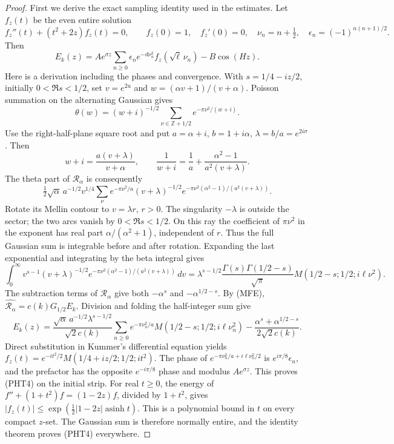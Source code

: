 \documentclass[11pt]{article}
\theoremstyle{remark}\newtheorem{remark}[theorem]{Remark}
\begin{document}
\begin{proof}
First we derive the exact sampling identity used in the estimates.
Let $f_z(t)$ be the even entire solution
\[
 f_z''(t)+(t^2+2z)f_z(t)=0,\qquad f_z(0)=1,\quad f_z'(0)=0,
 \quad \nu_n=n+\tfrac12,\quad \epsilon_n=(-1)^{n(n+1)/2}.
\]
Then
\[
 E_k(z)=Ae^{\sigma z}\sum_{n\ge0}\epsilon_ne^{-d\nu_n^2}
                   f_z(\sqrt\ell\,\nu_n)-B\cos(Hz).        \tag{PHT4}
\]
Here is a derivation including the phases and convergence.
With $s=1/4-iz/2$, initially $0<\Re s<1/2$, set
$v=e^{2u}$ and $w=(\alpha v+1)/(v+\alpha)$.
Poisson summation on the alternating Gaussian gives
\[
 \theta(w)=(w+i)^{-1/2}
       \sum_{\nu\in\mathbb Z+1/2}e^{-\pi\nu^2/(w+i)}.
\]
Use the right-half-plane square root and put
$a=\alpha+i$, $b=1+i\alpha$, $\lambda=b/a=e^{2i\sigma}$.
Then
\[
 w+i=\frac{a(v+\lambda)}{v+\alpha},\qquad
 \frac1{w+i}=\frac1a+\frac{\alpha^2-1}{a^2(v+\lambda)}.
\]
The theta part of $\mathcal R_\alpha$ is consequently
\[
 \tfrac12\sqrt\alpha\,a^{-1/2}v^{1/4}
 \sum_\nu e^{-\pi\nu^2/a}(v+\lambda)^{-1/2}
       e^{-\pi\nu^2(\alpha^2-1)/(a^2(v+\lambda))}.
\]
Rotate its Mellin contour to $v=\lambda r$, $r>0$.
The singularity $-\lambda$ is outside the sector; the two arcs
vanish by $0<\Re s<1/2$. On this ray the coefficient of $\pi\nu^2$
in the exponent has real part $\alpha/(\alpha^2+1)$,
independent of $r$. Thus the full Gaussian sum is integrable
before and after rotation. Expanding the last exponential and
integrating by the beta integral gives
\[
 \int_0^\infty v^{s-1}(v+\lambda)^{-1/2}
 e^{-\pi\nu^2(\alpha^2-1)/(a^2(v+\lambda))}\,dv
 =\lambda^{s-1/2}\frac{\Gamma(s)\Gamma(1/2-s)}{\sqrt\pi}
                  M(1/2-s;1/2;i\ell\nu^2).
\]
The subtraction terms of $\mathcal R_\alpha$ give both
$-\alpha^s$ and $-\alpha^{1/2-s}$.
By (MFE), $\widehat{\mathcal R_\alpha}=c(k)G_{1/2}E_k$.
Division and folding the half-integer sum give
\[
 E_k(z)=\frac{\sqrt\alpha\,a^{-1/2}\lambda^{s-1/2}}{\sqrt2c(k)}
 \sum_{n\ge0}e^{-\pi\nu_n^2/a}
        M(1/2-s;1/2;i\ell\nu_n^2)
       -\frac{\alpha^s+\alpha^{1/2-s}}{2\sqrt2c(k)}.
\]
Direct substitution in Kummer's differential equation yields
$f_z(t)=e^{-it^2/2}M(1/4+iz/2;1/2;it^2)$.
The phase of
$e^{-\pi\nu_n^2/a+i\ell\nu_n^2/2}$ is
$e^{i\pi/8}\epsilon_n$, and the prefactor has the opposite
$e^{-i\pi/8}$ phase and modulus $Ae^{\sigma z}$.
This proves (PHT4) on the initial strip.
For real $t\ge0$, the energy of
$f''+(1+t^2)f=(1-2z)f$, divided by $1+t^2$, gives
$|f_z(t)|\le\exp(\tfrac12|1-2z|\operatorname{asinh}t)$.
This is a polynomial bound in $t$ on every compact $z$-set.
The Gaussian sum is therefore normally entire, and the identity
theorem proves (PHT4) everywhere.


\end{proof}
\end{document}
